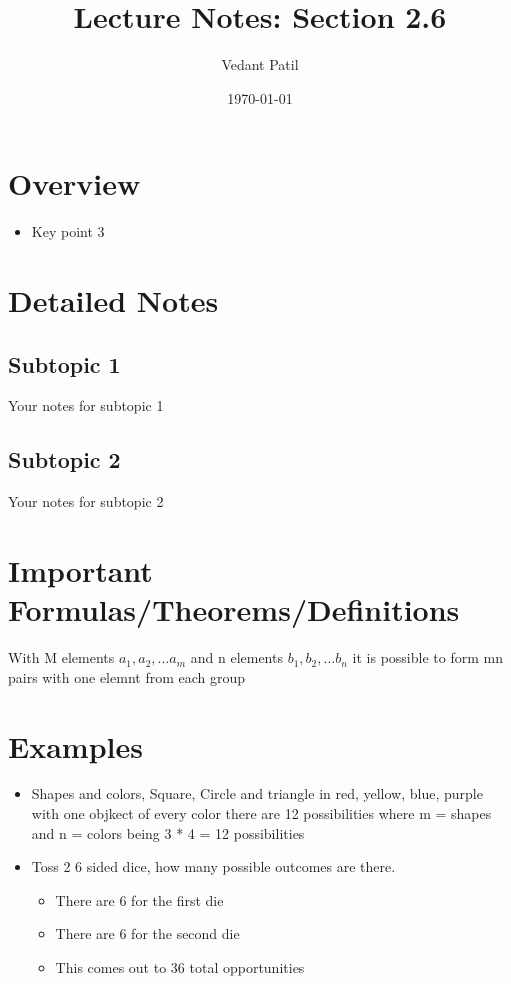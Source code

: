 \documentclass[12pt,a4paper]{article}
\title{Lecture Notes: Section 2.6}
\author{Vedant Patil}
\date{\today}
\begin{document}
\maketitle

\section{Overview}
\begin{tcolorbox}[colback=yellow!10!white,colframe=yellow!50!black,title=Key Points]
  \begin{itemize}
    \item Key point 3
  \end{itemize}
\end{tcolorbox}

\section{Detailed Notes}
\subsection{Subtopic 1}
Your notes for subtopic 1

\subsection{Subtopic 2}
Your notes for subtopic 2

\section{Important Formulas/Theorems/Definitions}
\begin{tcolorbox}[colback=blue!5!white,colframe=blue!75!black,title=Key Formula/Theorem]
  \begin{theorem}[2.1]
    With M elements \( a_{1}, a_{2}, \ldots a_{m} \) and n elements \( b_{1}, b_{2}, \ldots b_{n} \) it is possible to form mn pairs with one elemnt from each group 
  \end{theorem}
\end{tcolorbox}

\section{Examples}
\begin{tcolorbox}
  \begin{itemize}
    \item Shapes and colors, Square, Circle and triangle in red, yellow, blue, purple with one objkect of every color there are 12 possibilities where m = shapes and n = colors being 3 * 4 = 12 possibilities 
    \item Toss 2 6 sided dice, how many possible outcomes are there. 
      \begin{itemize}
        \item There are 6 for the first die 
        \item There are 6 for the second die 
        \item This comes out to 36 total opportunities 
      \end{itemize}
  \end{itemize}
\end{tcolorbox}
\end{document}
